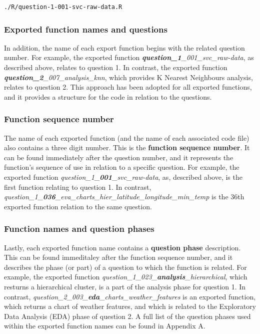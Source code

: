 \documentclass[12pt, oneside, openany]{book}
\begin{document}
\bigskip
\begin{lstlisting}[caption=Path to the R file containing the question 1 raw data function., label={lst:path-q1-raw-data}]
./R/question-1-001-svc-raw-data.R
\end{lstlisting}

\subsubsection*{Exported function names and questions}
In addition, the name of each export function begins with the related question number. For example, the exported function \emph{\textbf{question\_1}\_001\_svc\_raw-data}, as described above, relates to question 1. In contrast, the exported function \emph{\textbf{question\_2}\_007\_analysis\_knn}, which provides K Nearest Neighbours analysis, relates to question 2. This approach has been adopted for all exported functions, and it provides a structure for the code in relation to the questions.

\subsubsection*{Function sequence number}
The name of each exported function (and the name of each associated code file) also contains a three digit number. This is the \textbf{function sequence number}. It can be found immediately after the question number, and it represents the function's sequence of use in relation to a specific question. For example, the exported function \emph{question\_1\_\textbf{001}\_svc\_raw-data}, as, described above, is the first function relating to question 1. In contrast, \emph{question\_1\_\textbf{036}\_eva\_charts\_hier\_latitude\_longitude\_min\_temp} is the 36th exported function relation to the same question.

\subsubsection*{Function names and question phases}
Lastly, each exported function name contains a \textbf{question phase} description. This can be found immeditaley after the function sequence number, and it describes the phase (or part) of a question to which the function is related. For example, the exported function \emph{question\_1\_023\_\textbf{analysis}\_hierarchical}, which resturns a hierarchical cluster, is a part of the analysis phase for question 1. In contrast, \emph{question\_2\_003\_\textbf{eda}\_charts\_weather\_features} is an exported function, which returns a chart of weather features, and which is related to the Exploratory Data Analysis (EDA) phase of question 2. A full list of the question phases used within the exported function names can be found in Appendix A.
\end{document}
